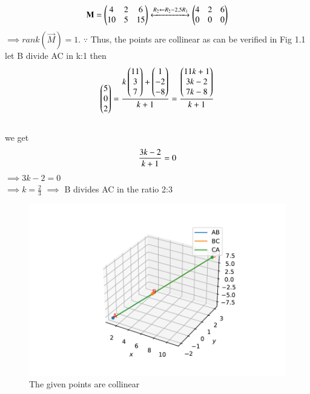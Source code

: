 \documentclass[journal,12pt,twocolumn]{IEEEtran}
\renewcommand\thesection{\arabic{section}}
\begin{document}
\begin{enumerate}[label=\thesection.\arabic*.,ref=\thesection.\theenumi]
 \begin{align}
\mathbf{M} = \begin{pmatrix}
4 & 2 & 6
\\
10 & 5 & 15
\end{pmatrix}
\xleftrightarrow {R_2\leftarrow R_2-2.5R_1}
\begin{pmatrix}
4 & 2 & 6
\\
0 & 0 & 0
\end{pmatrix}
\end{align}
%
$\implies rank(\vec{M}) = 1$.
$\because $
Thus, the points are collinear as can be verified
in Fig 1.1\\
let B divide AC in k:1 then\\
\[
    \begin{pmatrix}5\\0\\2\end{pmatrix} = \frac{k\begin{pmatrix}11\\3\\7\end{pmatrix}+\begin{pmatrix}1\\-2\\-8\end{pmatrix}}{k+1}
    =\frac{\begin{pmatrix}11k+1\\3k-2\\7k-8\end{pmatrix}}{k+1}
\]\\
we get
\[
\frac{3k-2}{k+1} = 0\\
\]
$\implies 3k-2 = 0$ \\
$\implies k = \frac{2}{3}$
$\implies $ B divides AC in the ratio 2:3
\begin{figure}[!ht]
	\centering
	\includegraphics[width=\columnwidth]{A1_figure.pdf}
	\caption{The given points are collinear}
	\label{}
\end{figure}
\end{enumerate}
\end{document}
